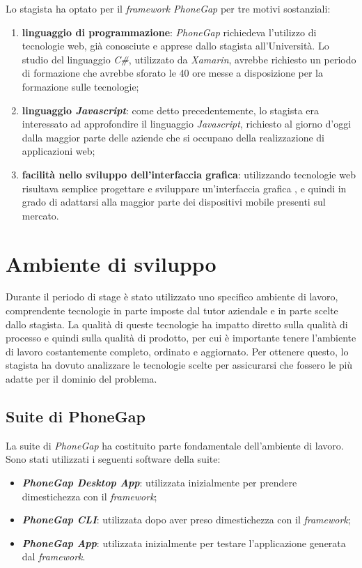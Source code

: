 Lo stagista ha optato per il \textit{framework PhoneGap} per tre motivi sostanziali:
\begin{enumerate}
	\item \textbf{linguaggio di programmazione}: \textit{PhoneGap} richiedeva l'utilizzo di tecnologie web, già conosciute e apprese dallo stagista all'Università. Lo studio del linguaggio \textit{C\#}, utilizzato da \textit{Xamarin}, avrebbe richiesto un periodo di formazione che avrebbe sforato le 40 ore messe a disposizione per la formazione sulle tecnologie;
	\item \textbf{linguaggio \textit{Javascript}}: come detto precedentemente, lo stagista era interessato ad approfondire il linguaggio \textit{Javascript}, richiesto al giorno d'oggi dalla maggior parte delle aziende che si occupano della realizzazione di applicazioni web;
	\item \textbf{facilità nello sviluppo dell'interfaccia grafica}: utilizzando tecnologie web risultava semplice progettare e sviluppare un'interfaccia grafica , e quindi in grado di adattarsi alla maggior parte dei dispositivi mobile presenti sul mercato.
\end{enumerate}

\section{Ambiente di sviluppo}

Durante il periodo di stage è stato utilizzato uno specifico ambiente di lavoro, comprendente tecnologie in parte imposte dal tutor aziendale e in parte scelte dallo stagista. La qualità di queste tecnologie ha impatto diretto sulla qualità di processo e quindi sulla qualità di prodotto, per cui è importante tenere l'ambiente di lavoro costantemente completo, ordinato e aggiornato. Per ottenere questo, lo stagista ha dovuto analizzare le tecnologie scelte per assicurarsi che fossero le più adatte per il dominio del problema.

\subsection{Suite di PhoneGap}

La suite di \textit{PhoneGap} ha costituito parte fondamentale dell'ambiente di lavoro. Sono stati utilizzati i seguenti software della suite:
\begin{itemize}
	\item \textbf{\textit{PhoneGap Desktop App}}: utilizzata inizialmente per prendere dimestichezza con il \textit{framework};
	\item \textbf{\textit{PhoneGap CLI}}: utilizzata dopo aver preso dimestichezza con il \textit{framework};
	\item \textbf{\textit{PhoneGap App}}: utilizzata inizialmente per testare l'applicazione generata dal \textit{framework}.
\end{itemize}

